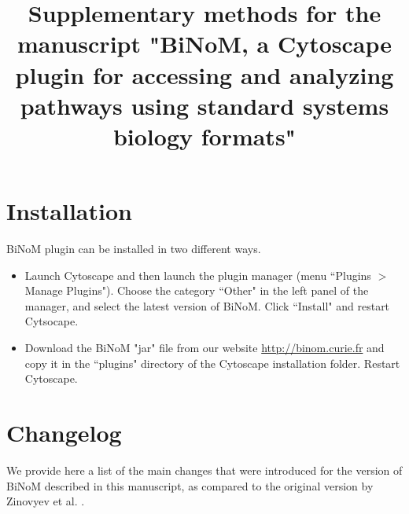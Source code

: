 \documentclass[a4paper,10pt]{article}
\title{Supplementary methods for the manuscript "BiNoM, a Cytoscape plugin for accessing and analyzing pathways using
standard systems biology formats"}
\author{}
\begin{document}
\maketitle



\section*{Installation}

BiNoM plugin can be installed in two different ways.

\begin{itemize}
 \item Launch Cytoscape and then launch the plugin manager (menu ``Plugins $>$ Manage
Plugins"). Choose the category ``Other" in the left panel of the manager, and
select the latest version of BiNoM. Click ``Install" and restart Cytsocape. 
  \item Download the BiNoM "jar" file from our website
\url{http://binom.curie.fr} and copy it in the ``plugins" directory of the
Cytoscape installation folder. Restart Cytoscape. 
\end{itemize}


\section*{Changelog}
We provide here a list of the main changes that were introduced for the version
of BiNoM described in this manuscript, as compared to the original version by
Zinovyev et al. \cite{zinovyev2008binom}.
\end{document}
